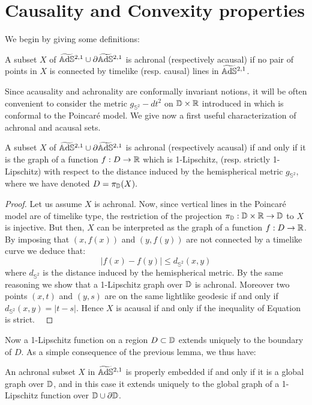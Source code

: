 \section{Causality and Convexity properties}
We begin by giving some definitions:
\begin{definition}
    A subset $X$ of $\widetilde{\mathbb{A}\mathrm{d}\mathbb{S}}{}^{2,1}\cup \partial\widetilde{\mathbb{A}\mathrm{d}\mathbb{S}}{}^{2,1}$ is achronal (respectively acausal) if no pair of points in $X$ is connected by timelike (resp. causal) lines in $\widetilde{\mathbb{A}\mathrm{d}\mathbb{S}}{}^{2,1}$.
\end{definition}
Since acausality and achronality are conformally invariant notions, it will be often convenient to consider the metric $g_{\mathbb{S}^2}-dt^2$ on $\mathbb{D}\times\mathbb{R}$ introduced in  which is conformal to the Poincaré model. We give now a first useful characterization of achronal and acausal sets.
\begin{lemma}
    A subset $X$ of $\widetilde{\mathbb{A}\mathrm{d}\mathbb{S}}{}^{2,1}\cup \partial\widetilde{\mathbb{A}\mathrm{d}\mathbb{S}}{}^{2,1}$ is achronal (respectively acausal) if and only if it is the graph of a function $f:D\to\mathbb{R}$ which is 1-Lipschitz, (resp. strictly 1-Lipschitz) with respect to the distance induced by the hemispherical metric $g_{\mathbb{S}^2},$ where we have denoted $D=\pi_{\mathbb{D}}(X).$ 
\end{lemma}
\begin{proof}
     Let us assume $X$ is achronal. Now, since vertical lines in the Poincaré model are of timelike type, the restriction of the projection $\pi_{\mathbb{D}}:\mathbb{D}\times\mathbb{R}\to\mathbb{D}$ to $X$ is injective. But then, $X$ can be interpreted as the graph of a function $f:D\to\mathbb{R}$. By imposing that $(x,f(x))$ and $(y,f(y))$ are not connected by a timelike curve we deduce that: 
     \begin{equation}\label{soloqua}
        |f(x)-f(y)|\leq d_{\mathbb{S}^2}(x,y)
     \end{equation}
     where $d_{\mathbb{S}^2}$ is the distance induced by the hemispherical metric. By the same reasoning we show that a 1-Lipschitz graph over $\mathbb{D}$ is achronal. Moreover two points $(x,t)$ and $(y,s)$ are on the same lightlike geodesic if and only if $d_{\mathbb{S}^2}(x,y)=|t-s|$. Hence $X$ is acausal if and only if the inequality of Equation  is strict. \
\end{proof}

Now a 1-Lipschitz function on a region $D\subset \mathbb{D}$ extends uniquely to the boundary of $D$. As a simple consequence of the previous lemma, we thus have: 

\begin{lemma}\label{achronalgraph}
    An achronal subset $X$ in $\widetilde{\mathbb{A}\mathrm{d}\mathbb{S}}{}^{2,1}$ is properly embedded if and only if it is a global graph over $\mathbb{D}$, and in this case it extends uniquely to the global graph of a 1-Lipschitz function over $\mathbb{D}\cup\partial\mathbb{D}$.
\end{lemma}

